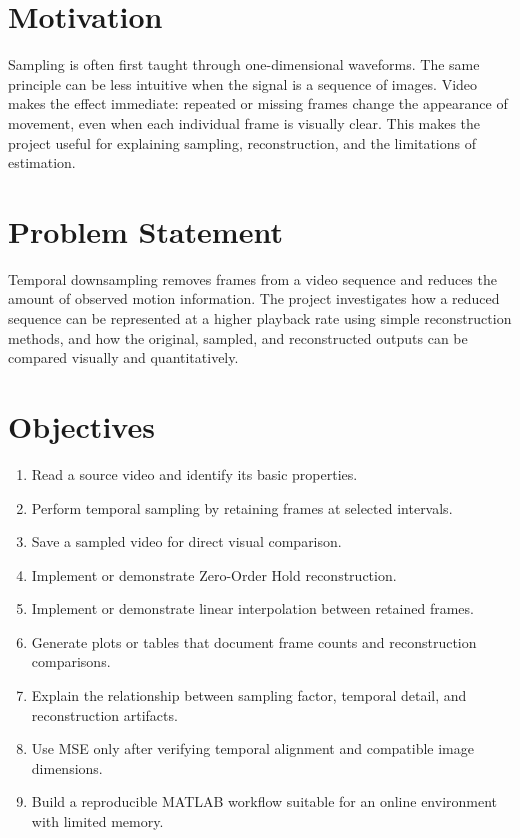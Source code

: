 \documentclass[12pt,a4paper,oneside]{report}
\begin{document}
\section{Motivation}
Sampling is often first taught through one-dimensional waveforms. The same principle can be less intuitive when the signal is a sequence of images. Video makes the effect immediate: repeated or missing frames change the appearance of movement, even when each individual frame is visually clear. This makes the project useful for explaining sampling, reconstruction, and the limitations of estimation.

\section{Problem Statement}
Temporal downsampling removes frames from a video sequence and reduces the amount of observed motion information. The project investigates how a reduced sequence can be represented at a higher playback rate using simple reconstruction methods, and how the original, sampled, and reconstructed outputs can be compared visually and quantitatively.

\section{Objectives}
\begin{enumerate}[leftmargin=*]
\item Read a source video and identify its basic properties.
\item Perform temporal sampling by retaining frames at selected intervals.
\item Save a sampled video for direct visual comparison.
\item Implement or demonstrate Zero-Order Hold reconstruction.
\item Implement or demonstrate linear interpolation between retained frames.
\item Generate plots or tables that document frame counts and reconstruction comparisons.
\item Explain the relationship between sampling factor, temporal detail, and reconstruction artifacts.
\item Use MSE only after verifying temporal alignment and compatible image dimensions.
\item Build a reproducible MATLAB workflow suitable for an online environment with limited memory.
\end{enumerate}
\end{document}
